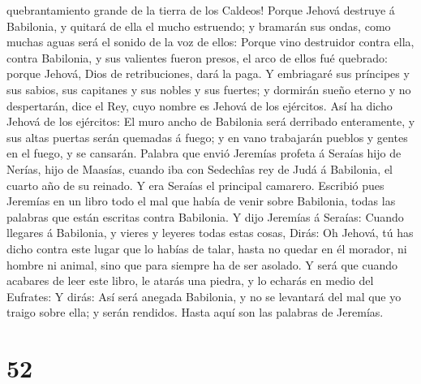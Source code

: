 quebrantamiento grande de la tierra de los Caldeos!  Porque
Jehová destruye á Babilonia, y quitará de ella el mucho estruendo; y
bramarán sus ondas, como muchas aguas será el sonido de la voz de ellos:
 Porque vino destruidor contra ella, contra Babilonia, y
sus valientes fueron presos, el arco de ellos fué quebrado: porque
Jehová, Dios de retribuciones, dará la paga.  Y embriagaré
sus príncipes y sus sabios, sus capitanes y sus nobles y sus fuertes; y
dormirán sueño eterno y no despertarán, dice el Rey, cuyo nombre es
Jehová de los ejércitos.  Así ha dicho Jehová de los
ejércitos: El muro ancho de Babilonia será derribado enteramente, y sus
altas puertas serán quemadas á fuego; y en vano trabajarán pueblos y
gentes en el fuego, y se cansarán.  Palabra que envió
Jeremías profeta á Seraías hijo de Nerías, hijo de Maasías, cuando iba
con Sedechîas rey de Judá á Babilonia, el cuarto año de su reinado. Y
era Seraías el principal camarero.  Escribió pues Jeremías
en un libro todo el mal que había de venir sobre Babilonia, todas las
palabras que están escritas contra Babilonia.  Y dijo
Jeremías á Seraías: Cuando llegares á Babilonia, y vieres y leyeres
todas estas cosas,  Dirás: Oh Jehová, tú has dicho contra
este lugar que lo habías de talar, hasta no quedar en él morador, ni
hombre ni animal, sino que para siempre ha de ser asolado. 
Y será que cuando acabares de leer este libro, le atarás una piedra, y
lo echarás en medio del Eufrates:  Y dirás: Así será
anegada Babilonia, y no se levantará del mal que yo traigo sobre ella; y
serán rendidos. Hasta aquí son las palabras de Jeremías.

\hypertarget{section-51}{%
\section{52}\label{section-51}}

